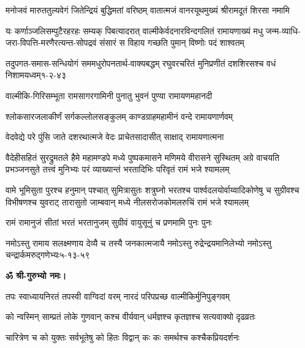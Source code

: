 \fourlineindentedshloka
{मनोजवं मारुततुल्यवेगं}
{जितेन्द्रियं बुद्धिमतां वरिष्ठम्}
{वातात्मजं वानरयूथमुख्यं}
{श्रीरामदूतं शिरसा नमामि}

\medskip
\resetShloka
{}

\fourlineindentedshloka
{यः कर्णाञ्जलिसम्पुटैरहरहः सम्यक् पिबत्यादरात्}
{वाल्मीकेर्वदनारविन्दगलितं रामायणाख्यं मधु}
{जन्म-व्याधि-जरा-विपत्ति-मरणैरत्यन्त-सोपद्रवं}
{संसारं स विहाय गच्छति पुमान् विष्णोः पदं शाश्वतम्}

\annofourlineindentedshloka
{तदुपगत-समास-सन्धियोगं}
{सममधुरोपनतार्थ-वाक्यबद्धम्}
{रघुवरचरितं मुनिप्रणीतं}
{दशशिरसश्च वधं निशामयध्वम्}{१-२-४३}

\twolineshloka
{वाल्मीकि-गिरिसम्भूता रामसागरगामिनी}
{पुनातु भुवनं पुण्या रामायणमहानदी}

\twolineshloka
{श्लोकसारजलाकीर्णं सर्गकल्लोलसङ्कुलम्}
{काण्डग्राहमहामीनं वन्दे रामायणार्णवम्}

\twolineshloka
{वेदवेद्ये परे पुंसि जाते दशरथात्मजे}
{वेदः प्राचेतसादासीत् साक्षाद् रामायणात्मना}

\medskip
\resetShloka
{}

\fourlineindentedshloka
{वैदेहीसहितं सुरद्रुमतले हैमे महामण्डपे}
{मध्ये पुष्पकमासने मणिमये वीरासने सुस्थितम्}
{अग्रे वाचयति प्रभञ्जनसुते तत्त्वं मुनिभ्यः परं}
{व्याख्यान्तं भरतादिभिः परिवृतं रामं भजे श्यामलम्}

\fourlineindentedshloka
{वामे भूमिसुता पुरश्च हनुमान् पश्चात् सुमित्रासुतः}
{शत्रुघ्नो भरतश्च पार्श्वदलयोर्वाय्वादिकोणेषु च}
{सुग्रीवश्च विभीषणश्च युवराट् तारासुतो जाम्बवान्}
{मध्ये नीलसरोजकोमलरुचिं रामं भजे श्यामलम्}

\twolineshloka
{रामं रामानुजं सीतां भरतं भरतानुजम्}
{सुग्रीवं वायुसूनुं च प्रणमामि पुनः पुनः}

\annofourlineindentedshloka
{नमोऽस्तु रामाय सलक्ष्मणाय}
{देव्यै च तस्यै जनकात्मजायै}
{नमोऽस्तु रुद्रेन्द्रयमानिलेभ्यो}
{नमोऽस्तु चन्द्रार्कमरुद्गणेभ्यः}{५-१३-५९}

\centerline{\textbf{ॐ श्री-गुरुभ्यो नमः।}}


\clearpage
\resetShloka
{}

\twolineshloka
{तपः स्वाध्यायनिरतं तपस्वी वाग्विदां वरम्}
{नारदं परिपप्रच्छ वाल्मीकिर्मुनिपुङ्गवम्}%

\twolineshloka
{को न्वस्मिन् साम्प्रतं लोके गुणवान् कश्च वीर्यवान्}
{धर्मज्ञश्च कृतज्ञश्च सत्यवाक्यो दृढव्रतः}%

\twolineshloka
{चारित्रेण च को युक्तः सर्वभूतेषु को हितः}
{विद्वान् कः कः समर्थश्च कश्चैकप्रियदर्शनः}%

